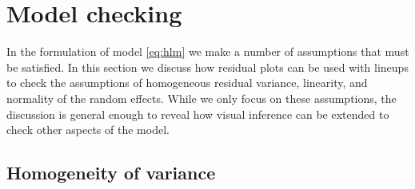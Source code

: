 \documentclass[12pt]{article} %
\begin{document}


\section{Model checking}\label{sec:checking}

In the formulation of model \eqref{eq:hlm} we make a number of assumptions that must be satisfied. In this section we discuss how residual plots can be used with lineups to check the assumptions of homogeneous residual variance, linearity, and normality of the random effects. While we only focus on these assumptions, the discussion is general enough to reveal how visual inference can be extended to check other aspects of the model.

%


\subsection{Homogeneity of variance}\label{sec:homogeneity}
\end{document}
